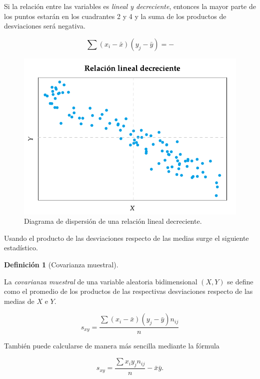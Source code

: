 \documentclass[
  a4paper,
]{scrreport}
\theoremstyle{plain}
\theoremstyle{definition}
\theoremstyle{definition}
\newtheorem{definition}{Definición}[chapter]
\theoremstyle{remark}
\begin{document}
Si la relación entre las variables es \emph{lineal y decreciente},
entonces la mayor parte de los puntos estarán en los cuadrantes 2 y 4 y
la suma de los productos de desviaciones será negativa.

\[\sum(x_i-\bar x)(y_j-\bar y) = -\]

\begin{figure}[H]

{\centering \includegraphics{img/regresion/diagrama_dispersion_lineal_decreciente.pdf}

}

\caption{Diagrama de dispersión de una relación lineal decreciente.}

\end{figure}%

Usando el producto de las desviaciones respecto de las medias surge el
siguiente estadístico.

\begin{definition}[Covarianza
muestral]\protect\hypertarget{def-covarianza}{}\label{def-covarianza}

La \emph{covarianza muestral} de una variable aleatoria bidimensional
\((X,Y)\) se define como el promedio de los productos de las respectivas
desviaciones respecto de las medias de \(X\) e \(Y\).

\[s_{xy}=\frac{\sum (x_i-\bar x)(y_j-\bar y)n_{ij}}{n}\]

\end{definition}

También puede calcularse de manera más sencilla mediante la fórmula

\[s_{xy}=\frac{\sum x_iy_jn_{ij}}{n}-\bar x\bar y.\]
\end{document}
